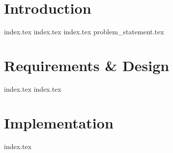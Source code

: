 \part{Introduction}\label{part:introduction}
{index.tex}
{index.tex}
{index.tex}
{problem_statement.tex}
\part{Requirements \& Design}
{index.tex}
{index.tex}
\part{Implementation}
{index.tex}
